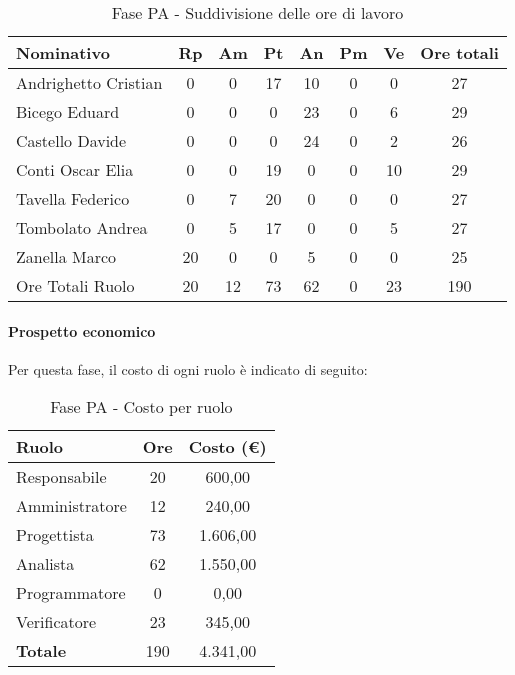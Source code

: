 \documentclass[../PianoProgetto.tex]{subfiles}
\begin{document}
					\begin{table}[h]
		\centering
	
		\begin{tabularx}{\textwidth}{l  * {6}{C}  c}
			\toprule
			\textbf{Nominativo} & \textbf{Rp} & \textbf{Am} & \textbf{Pt} 
						& \textbf{An} & \textbf{Pm} & \textbf{Ve} & \textbf{Ore totali} \\
			\midrule
			Andrighetto Cristian & 0 & 0 &	17 & 10 & 0 & 0 & 27 \\
			Bicego Eduard & 0 & 0 & 0 & 23 & 0 & 6 & 29 \\
			Castello Davide & 0 & 0 & 0 & 24 & 0 & 2 & 26 \\
			Conti Oscar Elia & 0 & 0 &	19 & 0 & 0 & 10 & 29 \\
			Tavella Federico &	0 & 7 & 20 & 0 & 0 & 0 & 27 \\
			Tombolato Andrea & 0 & 5 &	17 & 0 & 0 & 5 & 27 \\
			Zanella Marco & 20 & 0 & 0 & 5 & 0 & 0 & 25 \\
			\midrule			
			Ore Totali Ruolo & 20 & 12 & 73 & 62 & 0 & 23 & 190 \\
			\bottomrule
			
		\end{tabularx}
		
		\caption{Fase PA - Suddivisione delle ore di lavoro}
		\label{tab:fasePA_ore}
		
	\end{table}
	
	\paragraph{Prospetto economico}
					Per questa fase, il costo di ogni ruolo è indicato di seguito:
					\begin{table}[h]
		\centering
	
		\begin{tabular}{l * {2}{c}}
			\toprule
			\textbf{Ruolo} & \textbf{Ore} & \textbf{Costo (\euro{})} \\
			\midrule
			Responsabile &	20 & 600,00 \\
			Amministratore & 12 & 240,00 \\
			Progettista & 73 & 1.606,00 \\
			Analista & 62 & 1.550,00 \\
			Programmatore & 0 & 0,00 \\
			Verificatore & 23 & 345,00 \\
			\midrule		
			\textbf{Totale} & 190 & 4.341,00 \\
			\bottomrule
			
		\end{tabular}
		
		\caption{Fase PA - Costo per ruolo}
		\label{tab:fasePA_costo}
		
	\end{table}
	
\end{document}
